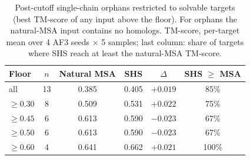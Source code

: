 \begin{table}[t]
\centering
\caption{Post-cutoff single-chain orphans restricted to solvable targets (best TM-score of any input above the floor). For orphans the natural-MSA input contains no homologs. TM-score, per-target mean over 4 AF3 seeds $\times$ 5 samples; last column: share of targets where SHS reach at least the natural-MSA TM-score.}
\label{tab:near_floor}
\begin{tabular}{lccccc}
\toprule
Floor & $n$ & Natural MSA & SHS & $\Delta$ & SHS $\ge$ MSA \\
\midrule
all & 13 & 0.385 & 0.405 & $+0.019$ & 85\% \\
$\ge 0.30$ & 8 & 0.509 & 0.531 & $+0.022$ & 75\% \\
$\ge 0.45$ & 6 & 0.613 & 0.590 & $-0.023$ & 67\% \\
$\ge 0.50$ & 6 & 0.613 & 0.590 & $-0.023$ & 67\% \\
$\ge 0.60$ & 4 & 0.641 & 0.662 & $+0.021$ & 100\% \\
\bottomrule
\end{tabular}
\end{table}
